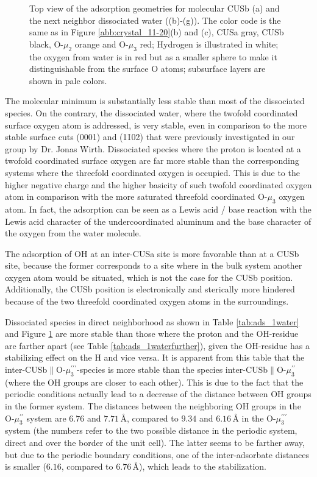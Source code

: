 \documentclass[11pt,DIV=13,BCOR=5mm,a4paper,headinclude]{scrbook}
\begin{document}
\begin{figure}[!ht]
 \caption{Top view of the adsorption geometries for molecular CUSb (a) and the next neighbor dissociated water 
((b)-(g)).
The color code is the same as in Figure \ref{abb:crystal_11-20}(b) and (c), CUSa gray, CUSb black, O-$\mu_2$ orange and O-$\mu_3$ red; Hydrogen is illustrated in white; the oxygen from water is in red but as a smaller sphere to make it distinguishable from the surface O atoms; subsurface layers are shown in pale colors.}
        \label{abb:ads-geoms}
 \end{figure}

The molecular minimum is substantially less stable than most of the dissociated species.
On the contrary, the dissociated water, where the twofold coordinated surface oxygen atom is addressed, is very stable, even in comparison to the more stable surface cuts (0001) and (1\=102) that were previously investigated in our group by Dr. Jonas Wirth\cite{Wirth2016,WirthJPCC2012}.
Dissociated species where the proton is located at a twofold coordinated surface oxygen are far more stable than the corresponding systems where the threefold coordinated oxygen is occupied.
This is due to the higher negative charge and the higher basicity of such twofold coordinated oxygen atom in comparison with the more saturated threefold coordinated O-$\mu_3$ oxygen atom.
In fact, the adsorption can be seen as a Lewis acid / base reaction\cite{Stair1981} with the Lewis acid character of the undercoordinated aluminum and the base character of the oxygen from the water molecule.


The adsorption of OH at an inter-CUSa site is more favorable than at a CUSb site, because the former corresponds to a site where in the bulk system another oxygen atom would be situated, which is not the case for the CUSb position.
Additionally, the CUSb position is electronically and sterically more hindered because of the two threefold coordinated oxygen atoms in the surroundings.


Dissociated species in direct neighborhood as shown in Table \ref{tab:ads_1water} and Figure \ref{abb:ads-geoms} are more stable than those where the proton and the OH-residue are farther apart (see Table \ref{tab:ads_1waterfurther}), given the OH-residue has a stabilizing effect on the H and vice versa.
It is apparent from this table that the inter-CUSb$\parallel$O-$\mu_3^{\prime\prime\prime}$-species is more stable than the species inter-CUSb$\parallel$O-$\mu_3^{\prime\prime}$ (where the OH groups are closer to each other).
This is due to the fact that the periodic conditions actually lead to a decrease of the distance between OH groups in the former system.
The distances between the neighboring OH groups in the O-$\mu_3^{\prime\prime}$ system are $6.76$ and $7.71\,$\AA{}, compared to $9.34$ and $6.16\,$\AA{} in the O-$\mu_3^{\prime\prime\prime}$ system (the numbers refer to the two possible distance in the periodic system, direct and over the border of the unit cell).
The latter seems to be farther away, but due to the periodic boundary conditions, one of the inter-adsorbate distances is smaller ($6.16$, compared to $6.76\,$\AA{}), which leads to the stabilization.
\end{document}
